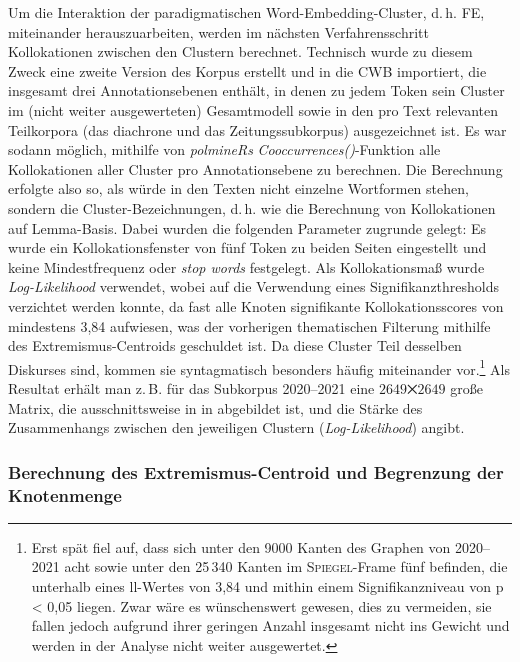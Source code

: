 Um die Interaktion der paradigmatischen Word-Embedding-Cluster, d.\,h. FE, miteinander herauszuarbeiten, werden im nächsten Verfahrensschritt Kollokationen zwischen den Clustern berechnet. Technisch wurde zu diesem Zweck eine zweite Version des Korpus erstellt und in die CWB importiert, die insgesamt drei Annotationsebenen enthält, in denen zu jedem Token sein Cluster im (nicht weiter ausgewerteten) Gesamtmodell sowie in den pro Text relevanten Teilkorpora (das diachrone und das Zeitungssubkorpus) ausgezeichnet ist. Es war sodann möglich, mithilfe von \emph{polmineRs} \emph{Cooccurrences()}-Funktion alle Kollokationen aller Cluster pro Annotationsebene zu berechnen. Die Berechnung erfolgte also so, als würde in den Texten nicht einzelne Wortformen stehen, sondern die Cluster-Bezeichnungen, d.\,h. wie die Berechnung von Kollokationen auf Lemma-Basis. Dabei wurden die folgenden Parameter zugrunde gelegt: Es wurde ein Kollokationsfenster von fünf Token zu beiden Seiten eingestellt und keine Mindestfrequenz oder \emph{stop words} festgelegt. Als Kollokationsmaß wurde \emph{Log-Likelihood} verwendet, wobei auf die Verwendung eines Signifikanzthresholds verzichtet werden konnte, da fast alle Knoten signifikante Kollokationsscores von mindestens 3,84 aufwiesen, was der vorherigen thematischen Filterung mithilfe des Extremismus-Centroids geschuldet ist. Da diese Cluster Teil desselben Diskurses sind, kommen sie syntagmatisch besonders häufig miteinander vor.\footnote{Erst spät fiel auf, dass sich unter den 9000 Kanten des Graphen von 2020--2021 acht sowie unter den 25\,340 Kanten im \textsc{Spiegel}-Frame fünf befinden, die unterhalb eines ll-Wertes von 3,84 und mithin einem Signifikanzniveau von p \textless{} 0,05 liegen. Zwar wäre es wünschenswert gewesen, dies zu vermeiden, sie fallen jedoch aufgrund ihrer geringen Anzahl insgesamt nicht ins Gewicht und werden in der Analyse nicht weiter ausgewertet.} Als Resultat erhält man z.\,B. für das Subkorpus 2020--2021 eine $2649྾2649$ große Matrix, die ausschnittsweise in  in  abgebildet ist, und die Stärke des Zusammenhangs zwischen den jeweiligen Clustern (\emph{Log-Likelihood}) angibt.

\subsubsection{Berechnung des Extremismus-Centroid und Begrenzung der Knotenmenge}\label{berechnung-des-extremismus-centroid-und-begrenzung-der-knotenmenge}

